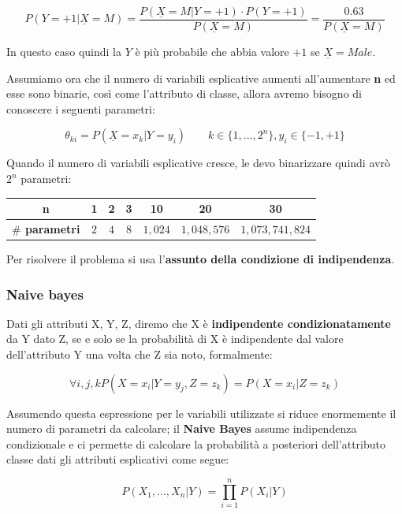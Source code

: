 \[P(Y = +1 | \underline{X} = M) = \frac{P(\underline{X} = M | Y=+1) \cdot P(Y=+1)}{P(\underline{X}= M)} = \frac{0.63}{P(\underline{X} = M)}\]

In questo caso quindi la $Y$ è più probabile che abbia valore $+1$ se $\underline{X} = Male$.

Assumiamo ora che il numero di variabili esplicative aumenti all'aumentare \textbf{n} ed esse sono binarie, così come l'attributo di classe, allora avremo bisogno di conoscere i seguenti parametri:

\[\theta_{ki} = P(\underline{X} = x_k | Y = y_i) \qquad k \in \{1, ..., 2^n\}, y_i \in \{-1,+1\}\]

Quando il numero di variabili esplicative cresce, le devo binarizzare quindi avrò $2^n$ parametri:

\begin{table}[H]
	\centering
	\begin{tabular}{|c|c|c|c|c|c|c|}
		\hline
		\textbf{n} & 1 & 2 & 3 & 10 & 20 & 30 \\
		\hline
		\textbf{$\#$ parametri}& $2$ & $4$ & $8$ & $1,024$ & $1,048,576$ & $1,073,741,824$  \\
		\hline
	\end{tabular}
\end{table}

Per risolvere il problema si usa l'\textbf{assunto della condizione di indipendenza}.

\subsubsection{Naive bayes}

\begin{defn}
Dati gli attributi X, Y, Z, diremo che X è \textbf{indipendente condizionatamente} da Y dato Z, se e solo se la probabilità di X è indipendente dal valore dell'attributo Y una volta che Z sia noto, formalmente: 

\[\forall i,j,k P(X=x_i|Y=y_j, Z=z_k) = P(X=x_i|Z=z_k)\]
\end{defn}

Assumendo questa espressione per le variabili utilizzate si riduce enormemente il numero di parametri da calcolare; il \textbf{Naive Bayes} assume indipendenza condizionale e ci permette di calcolare la probabilità a posteriori dell'attributo classe dati gli attributi esplicativi come segue: 

\[P(X_1, ..., X_n|Y) = \prod_{i=1}^n P(X_i|Y)\]


